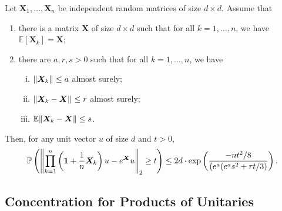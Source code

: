 \begin{thm}
    Let \( \bm{X}_1, \dots, \bm{X}_n \) be independent random matrices of size \( d \times d \). Assume that 
    \begin{enumerate}[1)]
      \item there is a matrix \( \bm{X} \) of size \( d \times d \) such that for all \( k=1, \dots, n \), we have \(\mathbb{E}\left[\bm{X}_k\right]=\bm{X}\);
      \item there are \( a,r,s >0 \) such that for all \( k=1,\dots, n \), we have 
        \begin{enumerate}[i)]
          \item \( \norm{\bm{X}_k}_{} \leq a \) almost surely;
          \item \( \norm{\bm{X}_k-\bm{X}}_{} \leq r\) almost surely;
          \item \( \mathbb{E}\norm{\bm{X}_k-\bm{X}} \leq s \).
        \end{enumerate}
    \end{enumerate} 
    Then, for any unit vector \( u  \) of size \( d \) and \( t >0  \), 
  \[\mathbb{P}\left(\norm{\prod_{k=1}^{n}\left(\bm{1}+\frac{1}{n}\bm{X}_k\right)u-e^{\bm{X}}u}_{2} \geq t \right) \leq 2d \cdot \operatorname{exp}\left(\frac{-nt^2/8}{(e^{a}(e^a s^2+rt/3)}\right) .\]
\end{thm}





\subsection{Concentration for Products of Unitaries}
